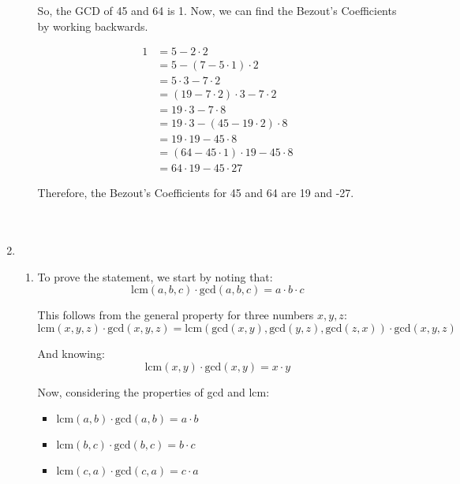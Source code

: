 \documentclass[a4paper]{article}
\begin{document}
\begin{enumerate}
\begin{enumerate}
            So, the GCD of 45 and 64 is 1. Now, we can find the Bezout's Coefficients by working backwards.

            \[
                \begin{split}
                    1 &= 5 - 2 \cdot 2 \\
                    &= 5 - (7 - 5 \cdot 1) \cdot 2 \\
                    &= 5 \cdot 3 - 7 \cdot 2 \\
                    &= (19 - 7 \cdot 2) \cdot 3 - 7 \cdot 2 \\
                    &= 19 \cdot 3 - 7 \cdot 8 \\
                    &= 19 \cdot 3 - (45 - 19 \cdot 2) \cdot 8 \\
                    &= 19 \cdot 19 - 45 \cdot 8 \\
                    &= (64 - 45 \cdot 1) \cdot 19 - 45 \cdot 8 \\
                    &= 64 \cdot 19 - 45 \cdot 27
                \end{split}
            \]

            Therefore, the Bezout's Coefficients for 45 and 64 are 19 and -27. \\ \\ \\
        \end{enumerate}

        \newpage
        \item \begin{enumerate}
            \item To prove the statement, we start by noting that:
            \[
                \text{lcm}(a, b, c) \cdot \text{gcd}(a, b, c) = a \cdot b \cdot c
            \]

            This follows from the general property for three numbers \(x, y, z\):
            \[
                \text{lcm}(x, y, z) \cdot \text{gcd}(x, y, z) = \text{lcm}(\text{gcd}(x, y), \text{gcd}(y, z), \text{gcd}(z, x)) \cdot \text{gcd}(x, y, z)
            \]

            And knowing:
            \[
                \text{lcm}(x, y) \cdot \text{gcd}(x, y) = x \cdot y
            \]

            Now, considering the properties of gcd and lcm:
            \begin{itemize}
                \item \(\text{lcm}(a, b) \cdot \text{gcd}(a, b) = a \cdot b\)
                \item \(\text{lcm}(b, c) \cdot \text{gcd}(b, c) = b \cdot c\)
                \item \(\text{lcm}(c, a) \cdot \text{gcd}(c, a) = c \cdot a\)
            \end{itemize}


\end{enumerate}
\end{enumerate}
\end{document}
